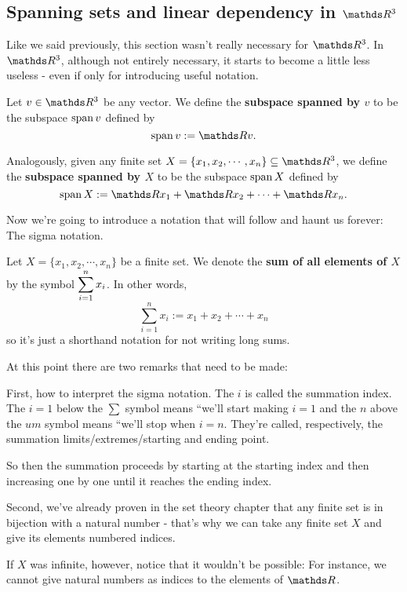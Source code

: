 \newpage
\subsection{Spanning sets and linear dependency in $\R^3$}

Like we said previously, this section wasn't really necessary for $\R^3$. In $\R^3$, although not entirely necessary, it starts to become a little less useless - even if only for introducing useful notation.

\begin{df}
	Let $v\in \R^3$ be any vector. We define the \textbf{subspace spanned by $v$} to be the subspace $\operatorname{span}{v}$ defined by
	\[\spen{v}:=\R v.\]
	
	Analogously, given any finite set $X=\{x_1,x_2,\cdots,x_n\}\subseteq\R^3$, we define the \textbf{subspace spanned by $X$} to be the subspace $\operatorname{span} X$ defined by
	\[\spen X:=\R x_1+\R x_2+\cdots+\R x_n.\]
\end{df}

Now we're going to introduce a notation that will follow and haunt us forever: The sigma notation.

\begin{df}
	Let $X=\{x_1,x_2,\cdots,x_n\}$ be a finite set. We denote the \textbf{sum of all elements of $X$} by the symbol $\displaystyle \sum_{i=1}^n x_i$. In other words,
	\[\sum_{i=1}^nx_i:=x_1+x_2+\cdots+x_n\]so it's just a shorthand notation for not writing long sums.
\end{df}

\begin{rmk}
	At this point there are two remarks that need to be made:
	
	First, how to interpret the sigma notation. The $i$ is called the summation index. The $i=1$ below the $\sum$ symbol means ``we'll start making $i=1$ and the $n$ above the $um$ symbol means ``we'll stop when $i=n$. They're called, respectively, the summation limits/extremes/starting and ending point.
	
	So then the summation proceeds by starting at the starting index and then increasing one by one until it reaches the ending index.
	
	
	\bigskip
	Second, we've already proven in the set theory chapter that any finite set is in bijection with a natural number - that's why we can take any finite set $X$ and give its elements numbered indices.
	
	If $X$ was infinite, however, notice that it wouldn't be possible: For instance, we cannot give natural numbers as indices to the elements of $\R$.
\end{rmk}

